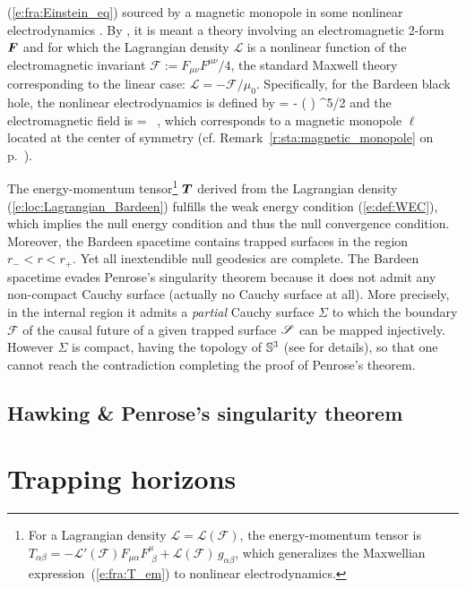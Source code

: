 \begin{example}
(\ref{e:fra:Einstein_eq}) sourced by a magnetic monopole in some nonlinear
electrodynamics \cite{AyonG00}. By ,
it is meant a theory involving an electromagnetic 2-form $\bm{F}$ and for which
the Lagrangian density $\mathcal{L}$ is
a nonlinear function of the electromagnetic invariant $\mathcal{F} := F_{\mu\nu} F^{\mu\nu} / 4$,
the standard Maxwell theory corresponding to the linear case: $\mathcal{L} = - \mathcal{F}/\mu_0$.
Specifically, for the Bardeen black hole, the nonlinear electrodynamics is defined by \cite{AyonG00}
\be \label{e:loc:Lagrangian_Bardeen}
     = -  \left(
     \right) ^{5/2}
\ee
and the electromagnetic field is
\be
     =  \ell \sin\th \, \dd\th \wedge \dd\ph,
\ee
which corresponds to a magnetic monopole $\ell$ located at the center of symmetry
(cf. Remark~\ref{r:sta:magnetic_monopole} on p.~\pageref{r:sta:magnetic_monopole}).

The energy-momentum tensor\footnote{For a Lagrangian density $\mathcal{L} = \mathcal{L}(\mathcal{F})$,
the energy-momentum tensor is
$T_{\alpha\beta} = - \mathcal{L}'(\mathcal{F}) F_{\mu\alpha} F^\mu_{\ \, \beta}
        + \mathcal{L}(\mathcal{F}) \, g_{\alpha\beta}$,
which generalizes the Maxwellian expression~(\ref{e:fra:T_em}) to nonlinear electrodynamics.}
$\bm{T}$ derived from the Lagrangian density (\ref{e:loc:Lagrangian_Bardeen})
fulfills the weak energy condition (\ref{e:def:WEC}), which implies the null energy condition and
thus the null convergence condition.
Moreover, the Bardeen spacetime contains trapped surfaces in the region $r_- < r < r_+$. Yet all inextendible null geodesics are complete. The Bardeen spacetime evades Penrose's singularity theorem
because it does not admit any non-compact Cauchy surface (actually no Cauchy surface at all). More precisely, in the internal region
it admits a \emph{partial} Cauchy surface $\Sigma$ to which the boundary $\mathscr{F}$
of the causal future of a given trapped surface $\mathscr{S}$ can be mapped injectively.
However $\Sigma$ is compact,
having the topology of $\mathbb{S}^3$ (see \cite{Borde97} for details), so that one cannot reach
the contradiction completing the proof of Penrose's theorem.
\end{example}


\subsection{Hawking \& Penrose's singularity theorem}



\section{Trapping horizons}


